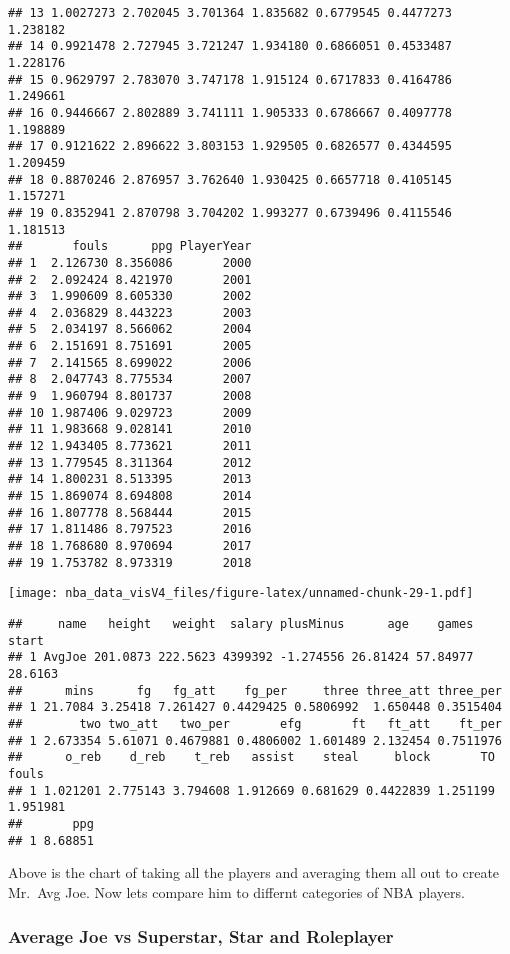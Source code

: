 \documentclass[]{article}
\begin{document}
\begin{verbatim}
## 13 1.0027273 2.702045 3.701364 1.835682 0.6779545 0.4477273 1.238182
## 14 0.9921478 2.727945 3.721247 1.934180 0.6866051 0.4533487 1.228176
## 15 0.9629797 2.783070 3.747178 1.915124 0.6717833 0.4164786 1.249661
## 16 0.9446667 2.802889 3.741111 1.905333 0.6786667 0.4097778 1.198889
## 17 0.9121622 2.896622 3.803153 1.929505 0.6826577 0.4344595 1.209459
## 18 0.8870246 2.876957 3.762640 1.930425 0.6657718 0.4105145 1.157271
## 19 0.8352941 2.870798 3.704202 1.993277 0.6739496 0.4115546 1.181513
##       fouls      ppg PlayerYear
## 1  2.126730 8.356086       2000
## 2  2.092424 8.421970       2001
## 3  1.990609 8.605330       2002
## 4  2.036829 8.443223       2003
## 5  2.034197 8.566062       2004
## 6  2.151691 8.751691       2005
## 7  2.141565 8.699022       2006
## 8  2.047743 8.775534       2007
## 9  1.960794 8.801737       2008
## 10 1.987406 9.029723       2009
## 11 1.983668 9.028141       2010
## 12 1.943405 8.773621       2011
## 13 1.779545 8.311364       2012
## 14 1.800231 8.513395       2013
## 15 1.869074 8.694808       2014
## 16 1.807778 8.568444       2015
## 17 1.811486 8.797523       2016
## 18 1.768680 8.970694       2017
## 19 1.753782 8.973319       2018
\end{verbatim}

\texttt{[image: nba\_data\_visV4\_files/figure-latex/unnamed-chunk-29-1.pdf]}

\begin{verbatim}
##     name   height   weight  salary plusMinus      age    games   start
## 1 AvgJoe 201.0873 222.5623 4399392 -1.274556 26.81424 57.84977 28.6163
##      mins      fg   fg_att    fg_per     three three_att three_per
## 1 21.7084 3.25418 7.261427 0.4429425 0.5806992  1.650448 0.3515404
##        two two_att   two_per       efg       ft   ft_att    ft_per
## 1 2.673354 5.61071 0.4679881 0.4806002 1.601489 2.132454 0.7511976
##      o_reb    d_reb    t_reb   assist    steal     block       TO    fouls
## 1 1.021201 2.775143 3.794608 1.912669 0.681629 0.4422839 1.251199 1.951981
##       ppg
## 1 8.68851
\end{verbatim}

Above is the chart of taking all the players and averaging them all out
to create Mr.~Avg Joe. Now lets compare him to differnt categories of
NBA players.

\subsubsection{Average Joe vs Superstar, Star and
Roleplayer}\label{average-joe-vs-superstar-star-and-roleplayer}
\end{document}
